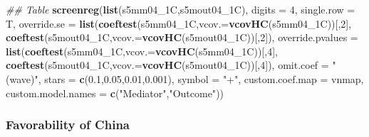 \documentclass[
]{article}
\newenvironment{Shaded}{\begin{snugshade}}{\end{snugshade}}
\newcommand{\CommentTok}[1]{\textcolor[rgb]{0.56,0.35,0.01}{\textit{#1}}}
\newcommand{\DataTypeTok}[1]{\textcolor[rgb]{0.13,0.29,0.53}{#1}}
\newcommand{\DecValTok}[1]{\textcolor[rgb]{0.00,0.00,0.81}{#1}}
\newcommand{\FloatTok}[1]{\textcolor[rgb]{0.00,0.00,0.81}{#1}}
\newcommand{\KeywordTok}[1]{\textcolor[rgb]{0.13,0.29,0.53}{\textbf{#1}}}
\newcommand{\NormalTok}[1]{#1}
\newcommand{\StringTok}[1]{\textcolor[rgb]{0.31,0.60,0.02}{#1}}
\begin{document}
\begin{Shaded}
\begin{Highlighting}[]
\CommentTok{## Table}
\KeywordTok{screenreg}\NormalTok{(}\KeywordTok{list}\NormalTok{(s5mm04_1C,s5mout04_1C), }\DataTypeTok{digits =} \DecValTok{4}\NormalTok{, }\DataTypeTok{single.row =}\NormalTok{ T,}
          \DataTypeTok{override.se =} \KeywordTok{list}\NormalTok{(}\KeywordTok{coeftest}\NormalTok{(s5mm04_1C,}\DataTypeTok{vcov.=}\KeywordTok{vcovHC}\NormalTok{(s5mm04_1C))[,}\DecValTok{2}\NormalTok{],}
                             \KeywordTok{coeftest}\NormalTok{(s5mout04_1C,}\DataTypeTok{vcov.=}\KeywordTok{vcovHC}\NormalTok{(s5mout04_1C))[,}\DecValTok{2}\NormalTok{]),}
          \DataTypeTok{override.pvalues =} \KeywordTok{list}\NormalTok{(}\KeywordTok{coeftest}\NormalTok{(s5mm04_1C,}\DataTypeTok{vcov.=}\KeywordTok{vcovHC}\NormalTok{(s5mm04_1C))[,}\DecValTok{4}\NormalTok{],}
                                  \KeywordTok{coeftest}\NormalTok{(s5mout04_1C,}\DataTypeTok{vcov.=}\KeywordTok{vcovHC}\NormalTok{(s5mout04_1C))[,}\DecValTok{4}\NormalTok{]),}
          \DataTypeTok{omit.coef =} \StringTok{"(wave)"}\NormalTok{, }\DataTypeTok{stars =} \KeywordTok{c}\NormalTok{(}\FloatTok{0.1}\NormalTok{,}\FloatTok{0.05}\NormalTok{,}\FloatTok{0.01}\NormalTok{,}\FloatTok{0.001}\NormalTok{), }\DataTypeTok{symbol =} \StringTok{"+"}\NormalTok{,}
          \DataTypeTok{custom.coef.map =}\NormalTok{ vnmap, }
          \DataTypeTok{custom.model.names =} \KeywordTok{c}\NormalTok{(}\StringTok{"Mediator"}\NormalTok{,}\StringTok{"Outcome"}\NormalTok{))}
\end{Highlighting}
\end{Shaded}

\hypertarget{favorability-of-china}{%
\subsubsection{Favorability of China}\label{favorability-of-china}}
\end{document}
